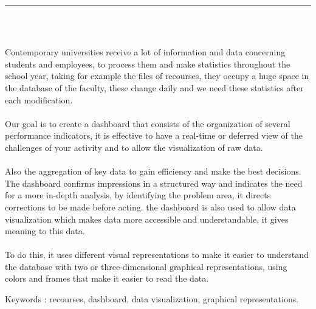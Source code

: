 \documentclass[12pt]{report}
\newenvironment{changemargin}[2]{%
\begin{list}{}{%
\setlength{\topsep}{0pt}%
\setlength{\leftmargin}{#1}%
\setlength{\rightmargin}{#2}%
\setlength{\listparindent}{\parindent}%
\setlength{\itemindent}{\parindent}%
\setlength{\parsep}{\parskip}%
}%
\item[]}{\end{list}}
\begin{document}
\newpage

\vspace*{0.2in}

\thispagestyle{empty}

\begin{center}
    {\color{Blue} \rule{3in}{1.4mm} }\\
    \vspace{0.1in}
    \scshape{\fontsize{34}{46}{\bfseries{\color{Blue}{Abstract}}}}
    \\
    \vspace{0.6in}
\end{center}
\begin{changemargin}{0.9cm}{0.9cm}
Contemporary universities receive a lot of information and data concerning students and employees, to process them and make statistics throughout the school year, taking for example the files of recourses, they occupy a huge space in the database of the faculty, these change daily and we need these statistics after each modification.
\\\\
Our goal is to create a dashboard that consists of the organization of several performance indicators, it is effective to have a real-time or deferred view of the challenges of your activity and to allow the visualization of raw data.
\\\\
Also the aggregation of key data to gain efficiency and make the best decisions. The dashboard confirms impressions in a structured way and indicates the need for a more in-depth analysis, by identifying the problem area, it directs corrections to be made before acting. the dashboard is also used to allow data visualization which makes data more accessible and understandable, it gives meaning to this data.
\\\\
To do this, it uses different visual representations to make it easier to understand the database with two or three-dimensional graphical representations, using colors and frames that make it easier to read the data.
\end{changemargin}

\vspace{1in}

\begin{changemargin}{0.9cm}{0.9cm}
Keywords : recourses, dashboard, data visualization, graphical representations.
\end{changemargin}
\end{document}
